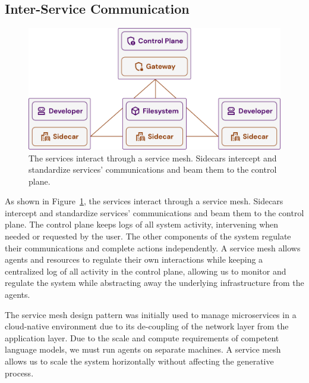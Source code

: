 \documentclass[a4paper,twocolumn,11pt]{quantumarticle}
\begin{document}
\subsection{Inter-Service Communication}
\begin{figure}[t]
  \centering
  \includegraphics[width=\columnwidth]{figures/inter-service_interaction.pdf}
  \caption{The services interact through a service mesh. Sidecars intercept and standardize services' communications and beam them to the control plane.}
  \label{fig:inter-service_interaction}
\end{figure}
As shown in Figure~\ref{fig:inter-service_interaction}, the services interact through a service mesh. Sidecars intercept and standardize services' communications and beam them to the control plane. The control plane keeps logs of all system activity, intervening when needed or requested by the user. The other components of the system regulate their communications and complete actions independently. A service mesh allows agents and resources to regulate their own interactions while keeping a centralized log of all activity in the control plane, allowing us to monitor and regulate the system while abstracting away the underlying infrastructure from the agents.

The service mesh design pattern was initially used to manage microservices in a cloud-native environment due to its de-coupling of the network layer from the application layer\cite{LiService}. Due to the scale and compute requirements of competent language models\cite{Touvron2023LLaMA}, we must run agents on separate machines. A service mesh allows us to scale the system horizontally without affecting the generative process.
\end{document}
